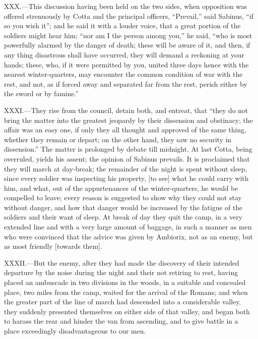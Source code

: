 XXX.—This discussion having been held on the two sides, when opposition
was offered strenuously by Cotta and the principal officers, ``Prevail,''
said Sabinus, ``if so you wish it''; and he said it with a louder voice,
that a great portion of the soldiers might hear him; ``nor am I the
person among you,'' he said, ``who is most powerfully alarmed by the
danger of death; these will be aware of it, and then, if any thing
disastrous shall have occurred, they will demand a reckoning at your
hands; these, who, if it were permitted by you, united three days hence
with the nearest winter-quarters, may encounter the common condition of
war with the rest, and not, as if forced away and separated far from the
rest, perish either by the sword or by famine.''

XXXI.—They rise from the council, detain both, and entreat, that ``they
do not bring the matter into the greatest jeopardy by their dissension
and obstinacy; the affair was an easy one, if only they all thought and
approved of the same thing, whether they remain or depart; on the other
hand, they saw no security in dissension.'' The matter is prolonged by
debate till midnight. At last Cotta, being overruled, yields his assent;
the opinion of Sabinus prevails. It is proclaimed that they will march
at day-break; the remainder of the night is spent without sleep, since
every soldier was inspecting his property, [to see] what he could carry
with him, and what, out of the appurtenances of the winter-quarters, he
would be compelled to leave; every reason is suggested to show why they
could not stay without danger, and how that danger would be increased by
the fatigue of the soldiers and their want of sleep. At break of day
they quit the camp, in a very extended line and with a very large amount
of baggage, in such a manner as men who were convinced that the advice
was given by Ambiorix, not as an enemy, but as most friendly [towards
them].

XXXII.—But the enemy, after they had made the discovery of their
intended departure by the noise during the night and their not retiring
to rest, having placed an ambuscade in two divisions in the woods, in a
suitable and concealed place, two miles from the camp, waited for the
arrival of the Romans; and when the greater part of the line of march
had descended into a considerable valley, they suddenly presented
themselves on either side of that valley, and began both to harass the
rear and hinder the van from ascending, and to give battle in a place
exceedingly disadvantageous to our men.

